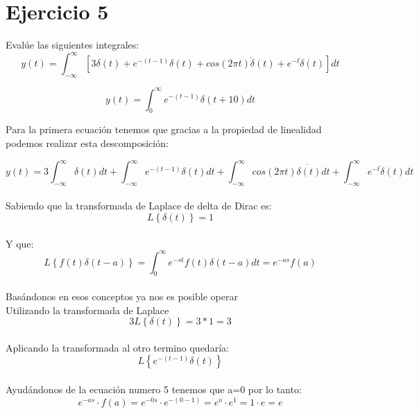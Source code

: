 \documentclass[10pt,a4paper]{report}
\begin{document}
\section{Ejercicio 5}

Evalúe las siguientes integrales:
\begin{equation}
y(t)=\int_{-\infty }^{\infty }[3\delta (t)+e^{-(t-1)}\delta (t)+cos(2\pi t)\dot{\delta} (t)+e^{-t}\ddot{\delta }(t) ]dt
\end{equation}

\begin{equation}
y(t)=\int_{0}^{\infty }e^{-(t-1)}\delta (t+10)dt
\end{equation}

Para la primera ecuación tenemos que gracias a la propiedad de linealidad podemos realizar esta descomposición:

\begin{equation}
y(t)=3\int_{-\infty }^{\infty }\delta (t)dt+\int_{-\infty }^{\infty }e^{-(t-1)}\delta (t)dt+\int_{-\infty }^{\infty }cos(2\pi t)\dot{\delta (t)}dt+\int_{-\infty }^{\infty }e^{-t}\ddot{\delta}(t)dt
\end{equation}\\
Sabiendo que la transformada de Laplace de delta de Dirac es:
\begin{equation}
L\left \{ \delta \left ( t \right ) \right \}=1
\end{equation}\\
Y que:
\begin{equation}
L\left \{ f(t)\delta (t-a) \right \}=\int_{0 }^{\infty }e^{-st}f(t)\delta (t-a)dt=e^{-as}f(a)
\end{equation}\\
Basándonos en esos conceptos ya nos es posible operar\\
Utilizando la transformada de Laplace
\begin{equation}
3L\left \{ \delta (t) \right \}=3\ast 1=3
\end{equation}\\
Aplicando la transformada al otro termino quedaría:
\begin{equation}
L\left \{ e^{-(t-1)}\delta (t) \right \}
\end{equation}\\
Ayudándonos de la ecuación numero 5 tenemos que a=0 por lo tanto:\\
\begin{equation}
e^{-as}\cdot f(a)=e^{-0s}\cdot e^{-(0-1)}=e^{o}\cdot e^{1}=1\cdot e=e
\end{equation}\\
\end{document}
